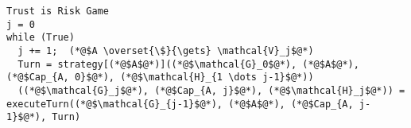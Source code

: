 \begin{lstlisting}[label=trustisriskgame]
Trust is Risk Game
j = 0
while (True)
  j += 1;  (*@$A \overset{\$}{\gets} \mathcal{V}_j$@*)
  Turn = strategy[(*@$A$@*)]((*@$\mathcal{G}_0$@*), (*@$A$@*), (*@$Cap_{A, 0}$@*), (*@$\mathcal{H}_{1 \dots j-1}$@*))
  ((*@$\mathcal{G}_j$@*), (*@$Cap_{A, j}$@*), (*@$\mathcal{H}_j$@*)) = executeTurn((*@$\mathcal{G}_{j-1}$@*), (*@$A$@*), (*@$Cap_{A, j-1}$@*), Turn)
\end{lstlisting}
